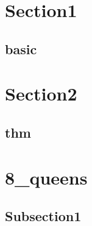 \section{Section1}
    \subsection{basic}
        

\section{Section2}
    \subsection{thm}
        
        
\section{8_queens}
    \subsection{Subsection1}
        


